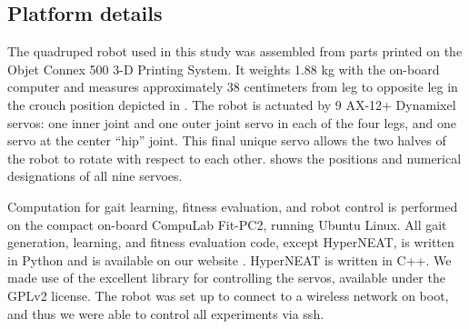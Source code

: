 \subsection{Platform details}






The quadruped robot used in this study was assembled from parts
printed on the Objet Connex 500 3-D Printing System. It weights 1.88
kg with the on-board computer and measures approximately 38
centimeters from leg to opposite leg in the crouch position depicted
in . The robot is actuated by 9 AX-12+
Dynamixel servos: one inner joint and one outer joint servo in each of
the four legs, and one servo at the center ``hip'' joint.  This final
unique servo allows the two halves of the robot to rotate with respect
to each other.  shows the positions and numerical
designations of all nine servoes.

Computation for gait learning, fitness evaluation, and robot control
is performed on the compact on-board CompuLab Fit-PC2, running Ubuntu
Linux.  All gait generation, learning, and fitness evaluation code,
except HyperNEAT, is written in Python and is available on our website
\cite{quadraWeb}.  HyperNEAT is written in C++.  We made use of the
excellent  library \cite{pydynamixel} for
controlling the servos, available under the GPLv2 license.  The robot
was set up to connect to a wireless network on boot, and thus we were
able to control all experiments via ssh.





